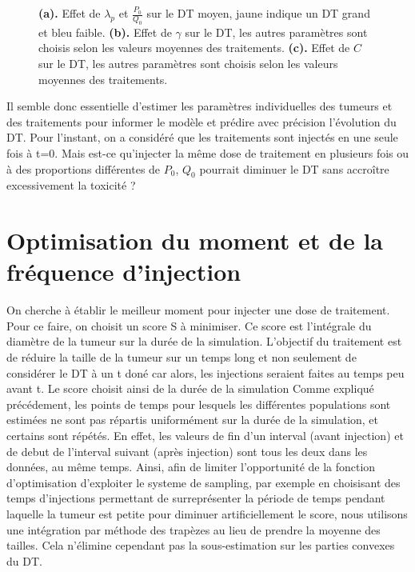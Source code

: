 \documentclass[12pt]{article}
\begin{document}
\begin{figure}
\begin{subfigure}[t]{0.45\textwidth}
        \caption{} \label{fig:effet_C}
    \end{subfigure}

    \caption{\textbf{(a).} Effet de $\lambda_{p}$ et $\frac{P_{0}}{Q_{0}}$ sur le DT moyen, jaune indique un DT grand et bleu faible. \textbf{(b).} Effet de $\gamma$ sur le DT, les autres paramètres sont choisis selon les valeurs moyennes des traitements. \textbf{(c).} Effet de $C$ sur le DT, les autres paramètres sont choisis selon les valeurs moyennes des traitements.}

\end{figure}
Il semble donc essentielle d'estimer les paramètres individuelles des tumeurs et des traitements pour informer le modèle et prédire avec précision l'évolution du DT. 
Pour l'instant, on a considéré que les traitements sont injectés en une seule fois à t=0.  Mais est-ce qu'injecter la même dose de traitement en plusieurs fois ou à des proportions différentes de $P_{0}$, $Q_{0}$ pourrait diminuer le DT sans accroître excessivement la toxicité ? 
\section{Optimisation du moment et de la fréquence d'injection}
On cherche à établir le meilleur moment pour injecter une dose de traitement. Pour ce faire, on choisit un score S à minimiser. Ce score est l'intégrale du diamètre de la tumeur sur la durée de la simulation. L'objectif du traitement est de réduire la taille de la tumeur sur un temps long et non seulement de considérer le DT à un t doné car alors, les injections seraient faites au temps peu avant t. Le score choisit ainsi de la durée de la simulation
Comme expliqué précédement, les points de temps pour lesquels les différentes populations sont estimées ne sont pas répartis uniformément sur la durée de la simulation, et certains sont répétés. En effet, les valeurs de fin d'un interval (avant injection) et de debut de l'interval suivant (après injection) sont tous les deux dans les données, au même temps. Ainsi, afin de limiter l'opportunité de la fonction d'optimisation d'exploiter le systeme de sampling, par exemple en choisisant des temps d'injections permettant de surreprésenter la période de temps pendant laquelle la tumeur est petite pour diminuer artificiellement le score, nous utilisons une intégration par méthode des trapèzes au lieu de prendre la moyenne des tailles. Cela n'élimine cependant pas la sous-estimation sur les parties convexes du \ac{DT}.
\end{document}
